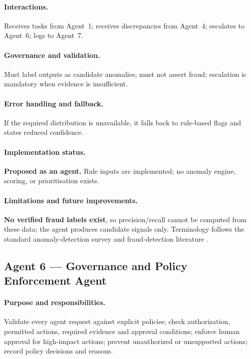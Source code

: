 \documentclass[11pt,a4paper]{article}
\begin{document}
\paragraph{Interactions.} Receives tasks from Agent~1; receives discrepancies from Agent~4; escalates to Agent~6; logs to Agent~7.

\paragraph{Governance and validation.} Must label outputs as candidate anomalies; must not assert fraud; escalation is mandatory when evidence is insufficient.

\paragraph{Error handling and fallback.} If the required distribution is unavailable, it falls back to rule-based flags and states reduced confidence.

\paragraph{Implementation status.} \textbf{Proposed as an agent.} Rule inputs are implemented; no anomaly engine, scoring, or prioritisation exists.

\paragraph{Limitations and future improvements.} \textbf{No verified fraud labels exist}, so precision/recall cannot be computed from these data; the agent produces candidate signals only. Terminology follows the standard anomaly-detection survey \cite{chandola2009} and fraud-detection literature \cite{ngai2011}.

\subsection{Agent 6 --- Governance and Policy Enforcement Agent}
\paragraph{Purpose and responsibilities.} Validate every agent request against explicit policies; check authorization, permitted actions, required evidence and approval conditions; enforce human approval for high-impact actions; prevent unauthorized or unsupported actions; record policy decisions and reasons.
\end{document}
